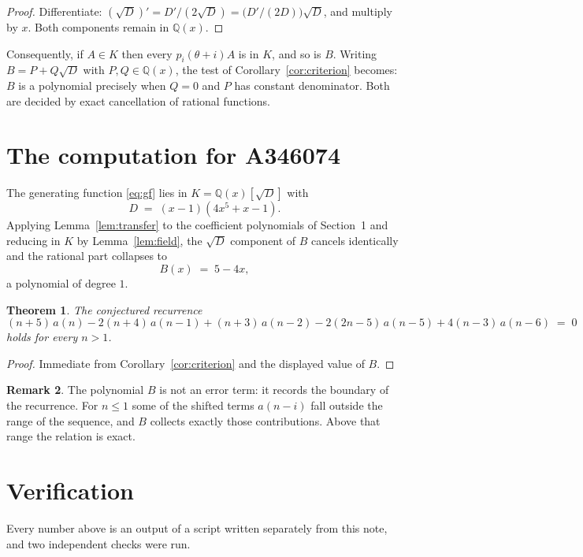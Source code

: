 \documentclass[11pt,a4paper]{article}
\theoremstyle{plain}
\newtheorem{theorem}{Theorem}
\theoremstyle{definition}
\newtheorem{remark}[theorem]{Remark}
\begin{document}
\begin{proof}
Differentiate: $(\sqrt{D})'=D'/(2\sqrt{D})=\bigl(D'/(2D)\bigr)\sqrt{D}$, and multiply by
$x$. Both components remain in $\mathbb{Q}(x)$.
\end{proof}

Consequently, if $A\in K$ then every $p_{i}(\theta+i)A$ is in $K$, and so is $B$. Writing
$B=P+Q\sqrt{D}$ with $P,Q\in\mathbb{Q}(x)$, the test of Corollary~\ref{cor:criterion}
becomes: $B$ is a polynomial precisely when $Q=0$ and $P$ has constant denominator. Both
are decided by exact cancellation of rational functions.

\section{The computation for A346074}

The generating function \eqref{eq:gf} lies in $K=\mathbb{Q}(x)[\sqrt{D}]$ with
\[
D \;=\; \left(x - 1\right) \left(4 x^{5} + x - 1\right) .
\]
Applying Lemma~\ref{lem:transfer} to the coefficient polynomials of Section~1 and reducing
in $K$ by Lemma~\ref{lem:field}, the $\sqrt{D}$ component of $B$ cancels identically and
the rational part collapses to
\[
B(x)\;=\;5 - 4 x ,
\]
a polynomial of degree $1$.

\begin{theorem}
The conjectured recurrence
\[
(n + 5)\,a(n) -  2 \left(n + 4\right)\,a(n-1) + (n + 3)\,a(n-2) -  2 \left(2 n - 5\right)\,a(n-5) + 4 \left(n - 3\right)\,a(n-6) \;=\;0
\]
holds for every $n>1$.
\end{theorem}

\begin{proof}
Immediate from Corollary~\ref{cor:criterion} and the displayed value of $B$.
\end{proof}

\begin{remark}
The polynomial $B$ is not an error term: it records the boundary of the recurrence. For
$n\le1$ some of the shifted terms $a(n-i)$ fall outside the range of the sequence,
and $B$ collects exactly those contributions. Above that range the relation is exact.
\end{remark}

\section{Verification}

Every number above is an output of a script written separately from this note, and two
independent checks were run.
\end{document}
